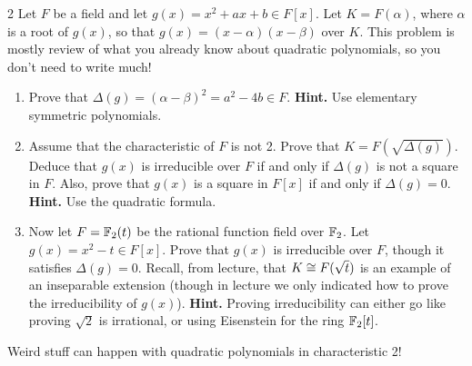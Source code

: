 \documentclass[12pt]{article}
\begin{document}
\newpage

\begin{problem}{2}
    Let $F$ be a field and let $g(x) = x^2+ax+b \in F[x]$.
    Let $K=F(\alpha)$, where $\alpha$ is a root of $g(x)$, so that $g(x) =
    (x-\alpha)(x-\beta)$ over $K$.  This problem is mostly review of what
    you already know about quadratic polynomials, so you don't need to
    write much!
    \begin{enumerate}\renewcommand{\itemsep}{3mm}
    \item Prove that $\Delta(g) = (\alpha-\beta)^2 = a^2-4b \in F$.   \textbf{Hint.}  Use elementary symmetric polynomials.

    \item Assume that the characteristic of $F$ is not 2.  Prove that $K =
    F(\sqrt{\Delta(g)})$. Deduce that $g(x)$ is irreducible over $F$ if
    and only if $\Delta(g)$ is not a square in $F$.  Also, prove that
    $g(x)$ is a square in $F[x]$ if and only if
    $\Delta(g)=0$. \textbf{Hint.} Use the quadratic formula.

    \item Now let $F = \mathbb F_2(t)$ be the rational function field over
    $\mathbb F_2$.  Let $g(x) = x^2-t \in F[x]$.  Prove that $g(x)$ is
    irreducible over $F$, though it satisfies $\Delta(g)=0$.  Recall, from
    lecture, that $K \cong F(\sqrt{t})$ is an example of an inseparable
    extension (though in lecture we only indicated how to prove the
    irreducibility of $g(x)$). \textbf{Hint.}  Proving irreducibility can
    either go like proving $\sqrt{2}$ is irrational, or using Eisenstein
    for the ring $\mathbb F_2[t]$.
    \end{enumerate}
    Weird stuff can happen with quadratic polynomials in characteristic 2! 
\end{problem}
\end{document}
